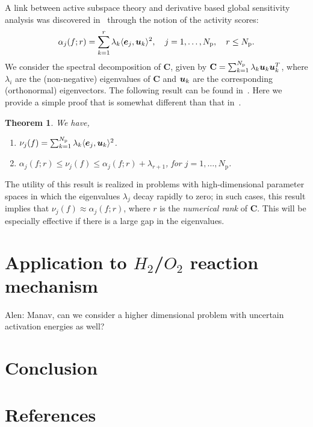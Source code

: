 \documentclass[1pt]{elsarticle}
\renewcommand{\vec}[1]{{\mathchoice
                     {\mbox{\boldmath$\displaystyle{#1}$}}
                     {\mbox{\boldmath$\textstyle{#1}$}}
                     {\mbox{\boldmath$\scriptstyle{#1}$}}
                     {\mbox{\boldmath$\scriptscriptstyle{#1}$}}}}
\newcommand{\ip}[2]{\langle{#1}, {#2}\rangle}
\newcommand{\mat}[1]{\mathbf{{#1}}}
\newcommand{\Np}{{N_\text{p}}}
\newcommand{\alennote}[1]{{\color{blue} Alen: {#1}}}
\newtheorem{theorem}{Theorem}[section]
\begin{document}
A link between active subspace theory and derivative based global sensitivity 
analysis was discovered in~\cite{Diaz16} through the notion of 
the activity scores:
\[
   \alpha_j(f; r) =  \sum_{k=1}^r \lambda_k \ip{\vec{e}_j}{\vec{u}_k}^2,
   \quad j = 1, \ldots, \Np, \quad r \leq \Np.
\]
We consider the spectral decomposition of $\mat{C}$, given by  
$\mat{C} = \sum_{k=1}^\Np \lambda_k \vec{u}_k \vec{u}_k^T$, where 
$\lambda_i$ are the (non-negative) eigenvalues of $\mat{C}$ and
$\vec{u}_k$ are the corresponding (orthonormal) eigenvectors.
The following result can be found in~\cite{Diaz16}. Here we provide
a simple proof that is somewhat different than that in~\cite{Diaz16}. 
\begin{theorem}
We have,
\begin{enumerate}
\item $\nu_j(f) = \sum_{k=1}^\Np \lambda_k \ip{\vec{e}_j}{\vec{u}_k}^2$. 
\item $\alpha_j(f; r) \leq \nu_j(f) \leq \alpha_j(f; r) + \lambda_{r+1}$, 
for $j=1, \ldots, \Np$.
\end{enumerate}
\end{theorem} 

The utility of this result is realized in 
problems with 
high-dimensional parameter spaces in which 
the eigenvalues $\lambda_j$ decay rapidly to zero; in 
such cases, this result implies that  $\nu_j(f) \approx \alpha_j(f; r)$,
where $r$ is the \emph{numerical rank} of $\mat{C}$.  This will be especially
effective if there is a large gap in the eigenvalues.  

\section{Application to $H_2$/$O_2$ reaction mechanism}

\alennote{Manav, can we consider a higher dimensional problem with uncertain
activation energies as well?}

\section{Conclusion}

\section*{References}


\end{document}
